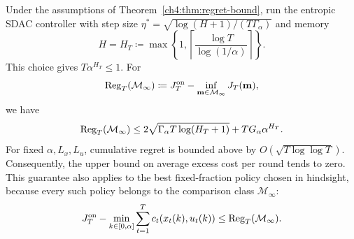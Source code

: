 \begin{Thm:Corollary}
\label{ch4:cor:regret-vs-infinite-sdac}
Under the assumptions of Theorem~\ref{ch4:thm:regret-bound}, run the entropic
SDAC controller with step size $\eta^*=\sqrt{\log(H+1)/(T\Gamma_\alpha)}$
and memory
\begin{equation}
\label{ch4:eq:def-infinite-memory-length}
H=H_T
\coloneqq
\max\!\left\{1,\left\lceil\frac{\log T}{\log(1/\alpha)}\right\rceil\right\}.
\end{equation}
This choice gives $T\alpha^{H_T}\le1$.
For
\begin{equation}
\label{ch4:eq:def-infinite-regret}
\mathrm{Reg}_T(\mathcal M_\infty)
\coloneqq J_T^{\mathrm{on}}-\inf_{\mathbf m\in\mathcal M_\infty}J_T(\mathbf m),
\end{equation}
we have
\begin{equation}
\label{ch4:eq:infinite-sdac-regret-bound}
\mathrm{Reg}_T(\mathcal M_\infty)
\le2\sqrt{\Gamma_\alpha T\log(H_T+1)}+TG_\alpha\alpha^{H_T}.
\end{equation}
For fixed $\alpha,L_x,L_u$, cumulative regret is bounded above by
$O(\sqrt{T\log\log T})$. Consequently, the upper bound on average excess cost
per round tends to zero. This guarantee also applies to the best
fixed-fraction policy chosen in hindsight, because every such policy belongs
to the comparison class $\mathcal M_\infty$:
\[
J_T^{\mathrm{on}}
-\min_{k\in[0,\alpha]}\sum_{t=1}^Tc_t(x_t(k),u_t(k))
\le\mathrm{Reg}_T(\mathcal M_\infty).
\]
\end{Thm:Corollary}
